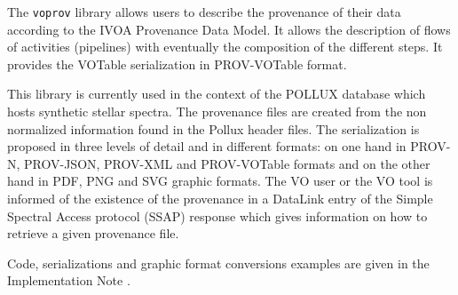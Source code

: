 The \texttt{voprov} library allows users to describe the provenance of their data
according to the IVOA Provenance Data Model. It allows the description of flows
of activities (pipelines) with eventually the composition of the different
steps. It provides the VOTable serialization in PROV-VOTable format.

This library is currently used in the context of the POLLUX database which hosts
synthetic stellar spectra. The provenance files are created from the non
normalized information found in the Pollux header files. The serialization is
proposed in three levels of detail and in different formats: on one hand in PROV-N,
PROV-JSON, PROV-XML and PROV-VOTable formats and on the other hand in PDF, PNG and SVG graphic
formats. The VO user or the VO tool is informed of the existence of the
provenance in a DataLink entry of the Simple Spectral Access protocol (SSAP) response which gives information on
how to retrieve a given provenance file.

Code, serializations and graphic format conversions examples are given in the Implementation Note
\citep{std:ProvenanceImplementationNote}.

%
%

